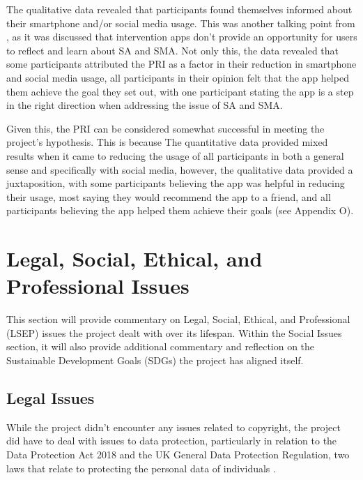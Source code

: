 \documentclass[12pt]{article}
\begin{document}
The qualitative data revealed that participants found themselves informed about their smartphone and/or social media usage. This was another talking point from 
\textcite{RefWorks:RefID:35-dosselaar2017smartphone}, as it was discussed that intervention apps don't provide an opportunity for users to reflect and learn about SA and SMA. Not only this,
the data revealed that some participants attributed the PRI as a factor in their reduction in smartphone and social media usage, all participants in their opinion felt that the app
helped them achieve the goal they set out, with one participant stating the app is a step in the right direction when addressing the issue of SA and SMA.\newline

Given this, the PRI can be considered somewhat successful in meeting the project's hypothesis. This is because The quantitative data provided mixed results when it came to reducing the 
usage of all participants in both a general sense and specifically with social media, however, the qualitative data provided a juxtaposition, with some participants believing the app was 
helpful in reducing their usage, most saying they would recommend the app to a friend, and all participants believing the app helped them achieve their goals (see Appendix O).


\newpage


\section{Legal, Social, Ethical, and Professional Issues}
This section will provide commentary on Legal, Social, Ethical, and Professional (LSEP) issues the project dealt with over its lifespan.
Within the Social Issues section, it will also provide additional commentary and reflection on the Sustainable Development Goals (SDGs)
the project has aligned itself.

\subsection{Legal Issues}
While the project didn't encounter any issues related to copyright, the project did have to deal with issues to data protection, particularly in
relation to the Data Protection Act 2018 and the UK General Data Protection Regulation, two laws that relate to protecting the personal data of
individuals \autocite{RefWorks:RefID:174-phillips2021uk}. \newline
\end{document}

